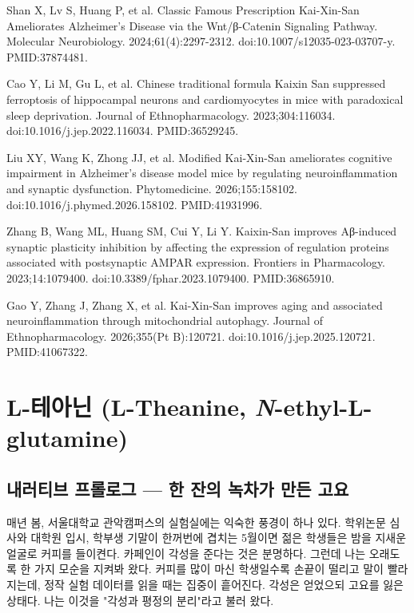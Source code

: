 \documentclass[12pt,oneside]{book}
\newcommand{\refend}{\endgroup\par}
\newcommand{\reff}[2]{\par\hangindent=7mm\hangafter=1\noindent[#1]\hspace{2mm}#2\par}
\begin{document}
\reff{58}{Shan X, Lv S, Huang P, et al. Classic Famous Prescription Kai-Xin-San Ameliorates Alzheimer's Disease via the Wnt/β-Catenin Signaling Pathway. Molecular Neurobiology. 2024;61(4):2297-2312. doi:10.1007/s12035-023-03707-y. PMID:37874481.}

\reff{59}{Cao Y, Li M, Gu L, et al. Chinese traditional formula Kaixin San suppressed ferroptosis of hippocampal neurons and cardiomyocytes in mice with paradoxical sleep deprivation. Journal of Ethnopharmacology. 2023;304:116034. doi:10.1016/j.jep.2022.116034. PMID:36529245.}

\reff{60}{Liu XY, Wang K, Zhong JJ, et al. Modified Kai-Xin-San ameliorates cognitive impairment in Alzheimer's disease model mice by regulating neuroinflammation and synaptic dysfunction. Phytomedicine. 2026;155:158102. doi:10.1016/j.phymed.2026.158102. PMID:41931996.}

\reff{61}{Zhang B, Wang ML, Huang SM, Cui Y, Li Y. Kaixin-San improves Aβ-induced synaptic plasticity inhibition by affecting the expression of regulation proteins associated with postsynaptic AMPAR expression. Frontiers in Pharmacology. 2023;14:1079400. doi:10.3389/fphar.2023.1079400. PMID:36865910.}

\reff{62}{Gao Y, Zhang J, Zhang X, et al. Kai-Xin-San improves aging and associated neuroinflammation through mitochondrial autophagy. Journal of Ethnopharmacology. 2026;355(Pt B):120721. doi:10.1016/j.jep.2025.120721. PMID:41067322.}

\refend


\chapter{L-테아닌 (L-Theanine, \textit{N}-ethyl-L-glutamine)}

\section{내러티브 프롤로그 — 한 잔의 녹차가 만든 고요}

매년 봄, 서울대학교 관악캠퍼스의 실험실에는 익숙한 풍경이 하나 있다. 학위논문 심사와 대학원 입시, 학부생 기말이 한꺼번에 겹치는 5월이면 젊은 학생들은 밤을 지새운 얼굴로 커피를 들이켠다. 카페인이 각성을 준다는 것은 분명하다. 그런데 나는 오래도록 한 가지 모순을 지켜봐 왔다. 커피를 많이 마신 학생일수록 손끝이 떨리고 말이 빨라지는데, 정작 실험 데이터를 읽을 때는 집중이 흩어진다. 각성은 얻었으되 고요를 잃은 상태다. 나는 이것을 "각성과 평정의 분리"라고 불러 왔다.
\end{document}
